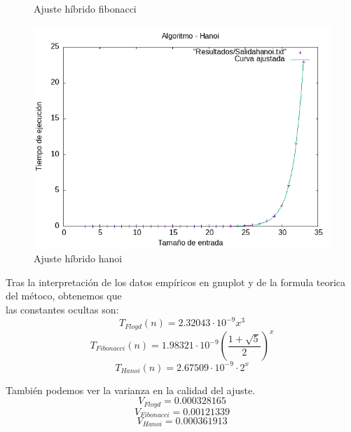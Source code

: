\documentclass[11pt]{article}
\begin{document}
\begin{figure}[H]
\begin{minipage}{0.5\textwidth}
        \caption{Ajuste híbrido fibonacci}
        \label{fig:fibonacci}
    \end{minipage}
    \begin{minipage}{0.5\textwidth}
        \centering
        \includegraphics[width=\linewidth]{assets/AjusteHibrido_latex/Hibrido_fibonacci_floyd_hanoi/Hanoi_hib.png}
        \caption{Ajuste híbrido hanoi}
        \label{fig:hanoi}
    \end{minipage}
\end{figure}
Tras la interpretación de los datos empíricos en gnuplot y de la formula teorica del métoco, obtenemos que \\
las constantes ocultas son:
\begin{equation*}
    T_{Floyd}(n)=2.32043\cdot 10^{-9}x^{3}
\end{equation*}
\begin{equation*}
    T_{Fibonacci}(n)=1.98321\cdot 10^{-9} \left(\frac{1+\sqrt{5}}{2}\right)^{x}
\end{equation*}
\begin{equation*}
    T_{Hanoi}(n)=2.67509\cdot 10^{-9} \cdot 2^{x}
\end{equation*}

También podemos ver la varianza en la calidad del ajuste. 
\begin{equation*}
    V_{Floyd}=0.000328165
\end{equation*}
\begin{equation*}
    V_{Fibonacci}=0.00121339
\end{equation*}
\begin{equation*}
    V_{Hanoi}=0.000361913
\end{equation*}
\end{document}

